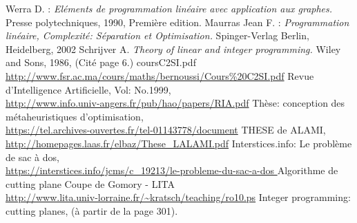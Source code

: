 \documentclass[a4paper,11pt,oneside]{report}
\theoremstyle{plain}
\newcommand{\0}{/ \! \! \! 0}
\theoremstyle{plain}
\begin{document}
\begin{thebibliography}{10}
Werra D. :
\emph{El\'ements de programmation lin\'eaire avec application aux graphes.}
Presse polytechniques, 1990, Premi\`ere edition.
Maurras Jean F. :
\emph{Programmation lin\'eaire, Complexit\'e: S\'eparation et Optimisation.}
Spinger-Verlag Berlin, Heidelberg, 2002
Schrijver A. \label{Schrijver}
\emph{Theory of linear and integer programming.}
Wiley and Sons, 1986, (Cit\'e page 6.)
coursC2SI.pdf \\
\url{http://www.fsr.ac.ma/cours/maths/bernoussi/Cours\%20C2SI.pdf}
Revue d'Intelligence Artificielle, Vol: No.1999,\\
\url{http://www.info.univ-angers.fr/pub/hao/papers/RIA.pdf}
Th\`ese: conception des m\'etaheuristiques d'optimisation,\\
\url{https://tel.archives-ouvertes.fr/tel-01143778/document}
THESE de ALAMI,\\
\url{http://homepages.laas.fr/elbaz/These_LALAMI.pdf}
Interstices.info: Le probl\`eme de sac \`a dos,\\
\url{https://interstices.info/jcms/c_19213/le-probleme-du-sac-a-dos }
Algorithme de cutting plane Coupe de Gomory - LITA\\
\url{http://www.lita.univ-lorraine.fr/~kratsch/teaching/ro10.ps}
Integer programming: cutting planes, (\`a partir de la page 301).\\

\end{thebibliography}
\end{document}
